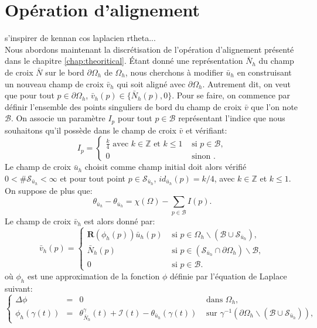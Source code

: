 \section{Opération d'alignement}
s'inspirer de kennan cos laplacien rtheta...
\[\]
Nous abordons maintenant la discrétisation de l'opération d'alignement présenté dans le chapitre \ref{chap:theoritical}. Étant donné une représentation $\bar{N}_h$ du champ de croix $\bar{N}$ sur le bord $\partial\Omega_h$ de $\Omega_h$, nous cherchons à modifier $\bar{u}_h$ en construisant un nouveau champ de croix $\bar{v}_h$ qui soit aligné avec $\partial\Omega_h$. Autrement dit, on veut que pour tout $p\in\partial\Omega_h$, $\bar{v}_h(p)\in\{\bar{N}_h(p), 0\}$. Pour se faire, on commence par définir l'ensemble des points singuliers de bord du champ de croix $\bar{v}$ que l'on note $\mathcal{B}$. On associe un paramètre $I_p$ pour tout $p\in\mathcal{B}$ représentant l'indice que nous souhaitons qu'il possède dans le champ de croix $\bar{v}$ et vérifiant:
\begin{equation}
I_p=
\left\{
\begin{array}{ll}
\displaystyle\frac{k}{4}\mbox{ avec }k\in\mathbb{Z}\mbox{ et }k\leq 1&\mbox{ si }p\in\mathcal{B},\\[0.5cm]
0&\mbox{ sinon }.
\end{array}
\right.
\end{equation}
Le champ de croix $\bar{u}_h$ choisit comme champ initial doit alors vérifié $0<\#\mathcal{S}_{\bar{u}_h}<\infty$ et pour tout point $p\in\mathcal{S}_{\bar{u}_h}$, $id_{\bar{u}_h}(p)=k/4$, avec $k\in\mathbb{Z}$ et $k\leq 1$. On suppose de plus que:
\begin{equation}
    \label{eqn:etude_hyp_u_simple}
    \theta_{\bar{u}_h}-\theta_{\bar{u}_h}=\chi(\Omega)-\sum_{p\in\mathcal{B}}I(p).
\end{equation}
Le champ de croix $\bar{v}_h$ est alors donné par:
\begin{equation}
\bar{v}_h(p)=
\left\{
\begin{array}{ll}
\mathbf{R}(\phi_h(p))\bar{u}_h(p) & \mbox{ si } p\in\Omega_h\backslash(\mathcal{B}\cup\mathcal{S}_{\bar{u}_h}),\\[0.5cm]
\bar{N}_h(p) & \mbox{ si } p\in(\mathcal{S}_{\bar{u}_h}\cap\partial\Omega_h)\backslash\mathcal{B},\\[0.5cm]
0 & \mbox{ si } p\in\mathcal{B}.
\end{array}
\right.
\label{eqn:etude_def_v_second}
\end{equation}
où $\phi_h$ est une approximation de la fonction $\phi$ définie par l'équation de Laplace suivant:\begin{equation}
\left\{
\begin{array}{lcll}
\Delta\phi &=& 0 &\mbox{ dans }\Omega_h,\\[0.5cm]
\phi_h(\gamma(t))&=&\theta^\gamma_{\bar{N}_h}(t)+\mathcal{I}(t)-\theta_{\bar{u}_h}(\gamma(t)) & \mbox{ sur } \gamma^{-1}(\partial\Omega_h\backslash(\mathcal{B}\cup\mathcal{S}_{\bar{u}_h})),
\end{array}
\right.
\end{equation}
